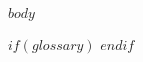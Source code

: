 \documentclass{scrbook} %
\begin{document}
	
	
	\ifisbook\cleardoubleemptypage\fi

	\tableofcontents
	\cleardoublepage

    $body$

    \listoffigures
    $if(glossary)$
    \printnoidxglossary
    $endif$
    
	\ifisbook\pagestyle{plain}\cleardoubleemptypage\fi
\end{document}
